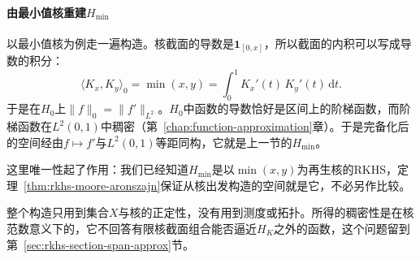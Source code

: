 \paragraph{由最小值核重建$H_{\min}$}

以最小值核为例走一遍构造。核截面的导数是$\mathbf 1_{[0,x]}$，所以截面的内积可以写成导数的积分：
\[
\langle K_x,K_y\rangle_0=\min(x,y)=\int_0^1K_x'(t)\,K_y'(t)\,\mathrm dt .
\]
于是在$H_0$上$\lVert f\rVert_0=\lVert f'\rVert_{L^2}$。$H_0$中函数的导数恰好是区间上的阶梯函数，而阶梯函数在$L^2(0,1)$中稠密（第~\ref{chap:function-approximation}章）。于是完备化后的空间经由$f\mapsto f'$与$L^2(0,1)$等距同构，它就是上一节的$H_{\min}$。

这里唯一性起了作用：我们已经知道$H_{\min}$是以$\min(x,y)$为再生核的RKHS，定理~\ref{thm:rkhs-moore-aronszajn}保证从核出发构造的空间就是它，不必另作比较。

整个构造只用到集合$X$与核的正定性，没有用到测度或拓扑。所得的稠密性是在核范数意义下的，它不回答有限核截面组合能否逼近$H_K$之外的函数，这个问题留到第~\ref{sec:rkhs-section-span-approx}节。
